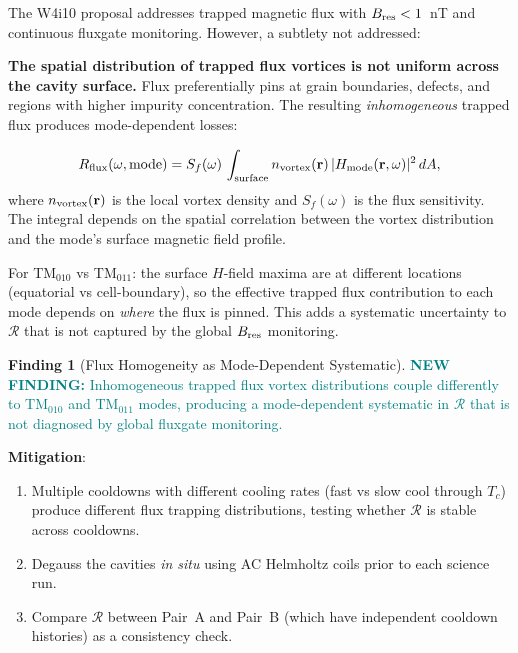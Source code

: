 \documentclass[11pt]{article}
\newcommand{\newfinding}[1]{\textcolor{teal}{\textbf{NEW FINDING:} #1}}
\theoremstyle{definition}
\newtheorem{finding}[theorem]{Finding}
\theoremstyle{remark}
\begin{document}
The W4i10 proposal addresses trapped magnetic flux with $B_{\rm res} < 1$~nT
and continuous fluxgate monitoring. However, a subtlety not addressed:

\textbf{The spatial distribution of trapped flux vortices is not uniform
across the cavity surface.} Flux preferentially pins at grain boundaries,
defects, and regions with higher impurity concentration. The resulting
\emph{inhomogeneous} trapped flux produces mode-dependent losses:

\begin{equation}
R_{\rm flux}(\omega, \text{mode}) = S_f(\omega)\,
\int_{\rm surface} n_{\rm vortex}(\mathbf{r})\,
|H_{\rm mode}(\mathbf{r},\omega)|^2\,dA,
\label{eq:flux_mode}
\end{equation}
where $n_{\rm vortex}(\mathbf{r})$ is the local vortex density and
$S_f(\omega)$ is the flux sensitivity. The integral depends on the
spatial correlation between the vortex distribution and the mode's
surface magnetic field profile.

For TM$_{010}$ vs TM$_{011}$: the surface $H$-field maxima are at
different locations (equatorial vs cell-boundary), so the effective
trapped flux contribution to each mode depends on \emph{where} the
flux is pinned. This adds a systematic uncertainty to $\mathcal{R}$
that is not captured by the global $B_{\rm res}$ monitoring.

\begin{finding}[Flux Homogeneity as Mode-Dependent Systematic]
\label{find:flux_hom}
\newfinding{Inhomogeneous trapped flux vortex distributions couple
differently to TM$_{010}$ and TM$_{011}$ modes, producing a
mode-dependent systematic in $\mathcal{R}$ that is not diagnosed
by global fluxgate monitoring.}

\textbf{Mitigation}:
\begin{enumerate}[nosep]
\item Multiple cooldowns with different cooling rates (fast vs slow
  cool through $T_c$) produce different flux trapping distributions,
  testing whether $\mathcal{R}$ is stable across cooldowns.
\item Degauss the cavities \emph{in situ} using AC Helmholtz coils
  prior to each science run.
\item Compare $\mathcal{R}$ between Pair~A and Pair~B (which have
  independent cooldown histories) as a consistency check.
\end{enumerate}
\end{finding}


\end{document}
